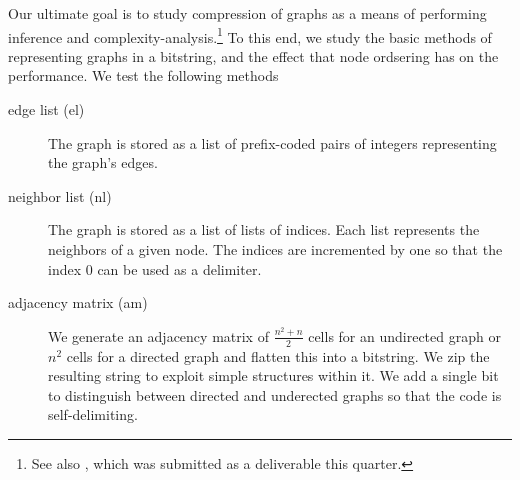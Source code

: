 \documentclass{article}
\begin{document}
Our ultimate goal is to study compression of graphs as a means of performing inference and complexity-analysis.\footnote{See also \cite{bloemcompression}, which was submitted as a deliverable this quarter.} To this end, we study the basic methods of representing graphs in a bitstring, and the effect that node ordsering has on the performance. We test the following methods
\begin{description}
\item[edge list (el)] The graph is stored as a list of prefix-coded pairs of integers representing the graph's edges. 
\item[neighbor list (nl)] The graph is stored as a list of lists of indices. Each list represents the neighbors of a given node. The indices are incremented by one so that the index 0 can be used as a delimiter.
\item[adjacency matrix (am)] We generate an adjacency matrix of $\frac{n^2 + n}{2}$ cells for an undirected graph or $n^2$ cells for a directed graph and flatten this into a bitstring. We zip the resulting string to exploit simple structures within it. We add a single bit to distinguish between directed and underected graphs so that the code is self-delimiting.
\end{description}
\end{document}
